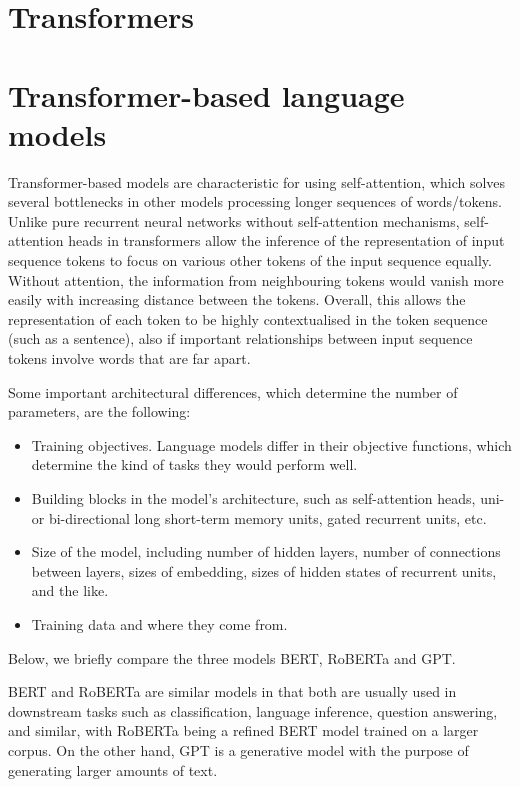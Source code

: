 \section*{\large Transformers}

\section{Transformer-based language models}

Transformer-based models are characteristic for using self-attention, which solves several bottlenecks in other models processing longer sequences of words/tokens. Unlike pure recurrent neural networks without self-attention mechanisms, self-attention heads in transformers allow the inference of the representation of input sequence tokens to focus on various other tokens of the input sequence equally. Without attention, the information from neighbouring tokens would vanish more easily with increasing distance between the tokens. Overall, this allows the representation of each token to be highly contextualised in the token sequence (such as a sentence), also if important relationships between input sequence tokens involve words that are far apart.

Some important architectural differences, which determine the number of parameters, are the following:
\begin{itemize}
    \item Training objectives. Language models differ in their objective functions, which determine the kind of tasks they would perform well.
    \item Building blocks in the model's architecture, such as self-attention heads, uni- or bi-directional long short-term memory units, gated recurrent units, etc.
    \item Size of the model, including number of hidden layers, number of connections between layers, sizes of embedding, sizes of hidden states of recurrent units, and the like.
    \item Training data and where they come from.
\end{itemize}
Below, we briefly compare the three models BERT, RoBERTa and GPT.

BERT and RoBERTa are similar models in that both are usually used in downstream tasks such as classification, language inference, question answering, and similar, with RoBERTa being a refined BERT model trained on a larger corpus. On the other hand, GPT is a generative model with the purpose of generating larger amounts of text.

